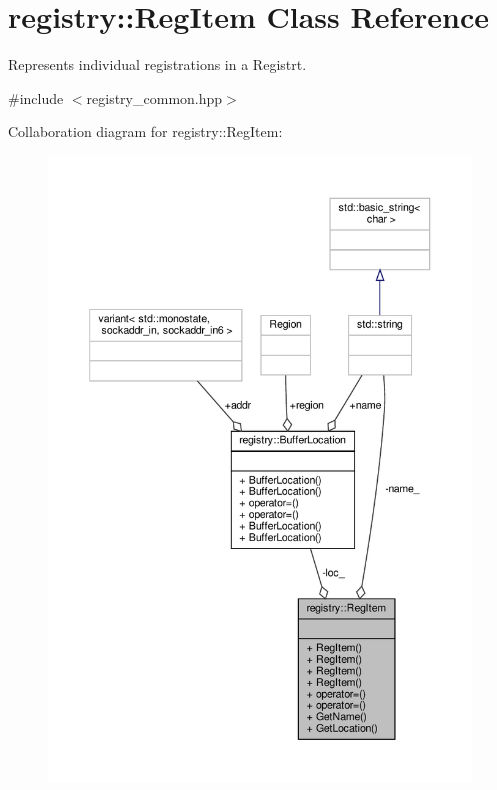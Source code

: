 \hypertarget{classregistry_1_1RegItem}{}\section{registry\+:\+:Reg\+Item Class Reference}
\label{classregistry_1_1RegItem}


Represents individual registrations in a Registrt.  




{\ttfamily \#include $<$registry\+\_\+common.\+hpp$>$}



Collaboration diagram for registry\+:\+:Reg\+Item\+:\nopagebreak
\begin{figure}[H]
\begin{center}
\leavevmode
\includegraphics[width=350pt]{classregistry_1_1RegItem__coll__graph}
\end{center}
\end{figure}

